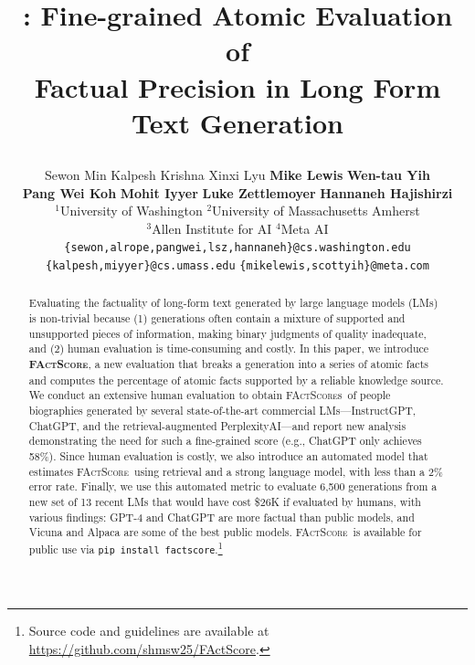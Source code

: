 \documentclass[11pt]{article}
\title{
    \ours:
    Fine-grained Atomic Evaluation of \\ Factual Precision in Long Form Text Generation

}
\author{Sewon Min\affilsup{$\dagger$1} \quad
    Kalpesh Krishna\affilsup{$\dagger$2} \quad
    Xinxi Lyu\affilsup{1} \quad
    \textbf{Mike Lewis}\affilsup{4} \quad 
    \textbf{Wen-tau Yih}\affilsup{4} \\
    \textbf{Pang Wei Koh}\affilsup{1} \quad
    \textbf{Mohit Iyyer}\affilsup{2} \quad
    \textbf{Luke Zettlemoyer}\affilsup{1,4} \quad
    \textbf{Hannaneh Hajishirzi}\affilsup{1,3} \\
    $^1$University of Washington \quad
    $^2$University of Massachusetts Amherst \\
    $^3$Allen Institute for AI \quad
    $^4$Meta AI \\
    \texttt{\{sewon,alrope,pangwei,lsz,hannaneh\}@cs.washington.edu} \\
    \texttt{\{kalpesh,miyyer\}@cs.umass.edu} \quad
    \texttt{\{mikelewis,scottyih\}@meta.com}
}
\newcommand{\ours}{\textsc{FActScore}}
\newcommand{\ourslong}{\textbf{F}actual precision in \textbf{A}tomi\textbf{c}i\textbf{t}y \textbf{Score}}
\newcommand{\ourScores}{\textsc{FActScore}s}
\begin{document}
\maketitle

\def\thefootnote{$\dagger$}\def\thefootnote{\arabic{footnote}}

\begin{abstract}
    Evaluating the factuality of long-form text generated by large language models (LMs) is non-trivial because (1) generations often contain a mixture of supported and unsupported pieces of information, making binary judgments of quality inadequate, and (2) human evaluation is time-consuming and costly.
    In this paper, we introduce \textbf{\ours}, %
    a new evaluation %
    that breaks a generation into a series of atomic facts and computes the percentage of atomic facts supported by a reliable knowledge source.
    We conduct an extensive human evaluation to obtain \ourScores\ of people biographies generated by several state-of-the-art commercial LMs---InstructGPT, ChatGPT, and the retrieval-augmented PerplexityAI---and report new analysis demonstrating the need for such a fine-grained score (e.g., ChatGPT only achieves 58\%).
    Since human evaluation is costly, 
    we also introduce an automated model that estimates \ours\ using retrieval and a strong language model, with less than a $2\%$ error rate. 
    Finally, we use this automated metric to evaluate 6,500 generations from a new set of 13 recent LMs that would have cost \$26K if evaluated by humans, with various findings: GPT-4 and ChatGPT are more factual than public models, and Vicuna and Alpaca are some of the best public models. \ours\ is available for public use via \texttt{pip install factscore}.\footnote{Source code and guidelines are available at \url{https://github.com/shmsw25/FActScore}.}
\end{abstract}
\end{document}
